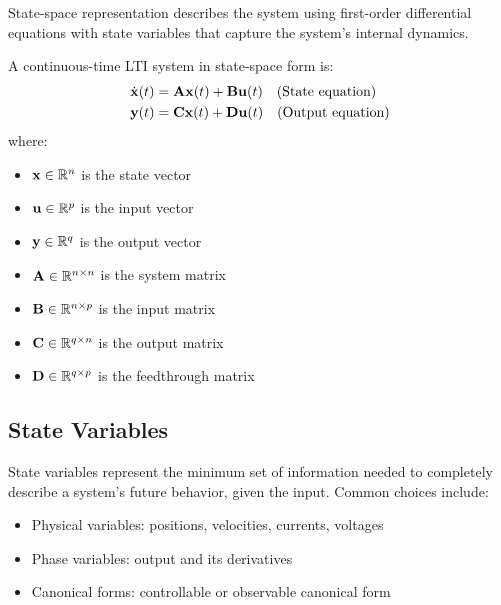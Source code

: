 State-space representation describes the system using first-order differential equations with state variables that capture the system's internal dynamics.

\begin{definition}
A continuous-time LTI system in state-space form is:
\begin{align}
\dot{\mathbf{x}}(t) &= \mathbf{A}\mathbf{x}(t) + \mathbf{B}\mathbf{u}(t) \quad \text{(State equation)} \label{eq:state_eq}\\
\mathbf{y}(t) &= \mathbf{C}\mathbf{x}(t) + \mathbf{D}\mathbf{u}(t) \quad \text{(Output equation)} \label{eq:output_eq}
\end{align}
where:
\begin{itemize}
    \item $\mathbf{x} \in \mathbb{R}^n$ is the state vector
    \item $\mathbf{u} \in \mathbb{R}^p$ is the input vector
    \item $\mathbf{y} \in \mathbb{R}^q$ is the output vector
    \item $\mathbf{A} \in \mathbb{R}^{n \times n}$ is the system matrix
    \item $\mathbf{B} \in \mathbb{R}^{n \times p}$ is the input matrix
    \item $\mathbf{C} \in \mathbb{R}^{q \times n}$ is the output matrix
    \item $\mathbf{D} \in \mathbb{R}^{q \times p}$ is the feedthrough matrix
\end{itemize}
\end{definition}

\subsection{State Variables}

State variables represent the minimum set of information needed to completely describe a system's future behavior, given the input. Common choices include:
\begin{itemize}
    \item Physical variables: positions, velocities, currents, voltages
    \item Phase variables: output and its derivatives
    \item Canonical forms: controllable or observable canonical form
\end{itemize}

